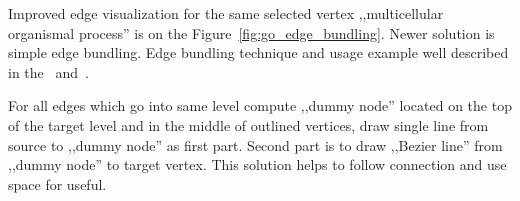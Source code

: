 Improved edge visualization for the same selected vertex ,,multicellular organismal process'' is on the Figure~\ref{fig:go_edge_bundling}. Newer solution is simple edge bundling. Edge bundling technique and usage example well described in the~\cite{EDGE_BUNDLING_1} and~\cite{EDGE_BUNDLING_2}.

For all edges which go into same level compute ,,dummy node'' located on the top of the target level and in the middle of outlined vertices, draw single line from source to ,,dummy node'' as first part. Second part is to draw ,,Bezier line'' from ,,dummy node'' to target vertex. This solution helps to follow connection and use space for useful. 